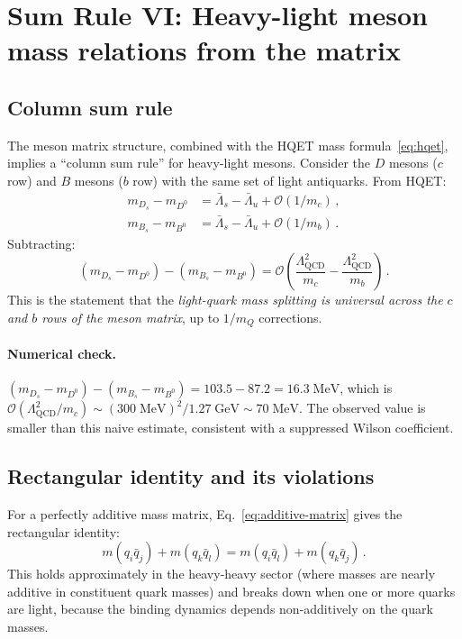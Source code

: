 \documentclass[11pt,a4paper]{article}
\newcommand{\QCD}{\ensuremath{\mathrm{QCD}}}
\newcommand{\Lbar}{\bar{\Lambda}}
\newcommand{\LQCD}{\Lambda_{\QCD}}
\newcommand{\Ord}{\mathcal{O}}
\theoremstyle{plain}
\begin{document}
\section{Sum Rule VI: Heavy-light meson mass relations from the matrix}
\label{sec:heavy-light-matrix}

\subsection{Column sum rule}

The meson matrix structure, combined with the HQET mass
formula~\eqref{eq:hqet}, implies a ``column sum rule'' for heavy-light
mesons.  Consider the $D$ mesons ($c$ row) and $B$ mesons ($b$ row)
with the same set of light antiquarks.  From HQET:
\begin{align}
  m_{D_s} - m_{D^0} &= \Lbar_s - \Lbar_u + \Ord(1/m_c)\,, \label{eq:col-c}\\
  m_{B_s} - m_{B^0} &= \Lbar_s - \Lbar_u + \Ord(1/m_b)\,. \label{eq:col-b}
\end{align}
Subtracting:
\begin{equation}\label{eq:col-diff}
  \boxed{(m_{D_s} - m_{D^0}) - (m_{B_s} - m_{B^0})
  = \Ord\!\left(\frac{\LQCD^2}{m_c} - \frac{\LQCD^2}{m_b}\right)\,.}
\end{equation}
This is the statement that the \emph{light-quark mass splitting is
universal across the $c$ and $b$ rows of the meson matrix}, up to
$1/m_Q$ corrections.

\paragraph{Numerical check.}
$(m_{D_s} - m_{D^0}) - (m_{B_s} - m_{B^0}) = 103.5 - 87.2 =
16.3\;\text{MeV}$, which is $\Ord(\LQCD^2/m_c) \sim
(300\;\text{MeV})^2/1.27\;\text{GeV} \sim 70\;\text{MeV}$.  The
observed value is smaller than this naive estimate, consistent with a
suppressed Wilson coefficient.

\subsection{Rectangular identity and its violations}

For a perfectly additive mass matrix, Eq.~\eqref{eq:additive-matrix}
gives the rectangular identity:
\begin{equation}\label{eq:rectangular}
  m(q_i\bar{q}_j) + m(q_k\bar{q}_l)
  = m(q_i\bar{q}_l) + m(q_k\bar{q}_j)\,.
\end{equation}
This holds approximately in the heavy-heavy sector (where masses are
nearly additive in constituent quark masses) and breaks down when one
or more quarks are light, because the binding dynamics depends
non-additively on the quark masses.
\end{document}
